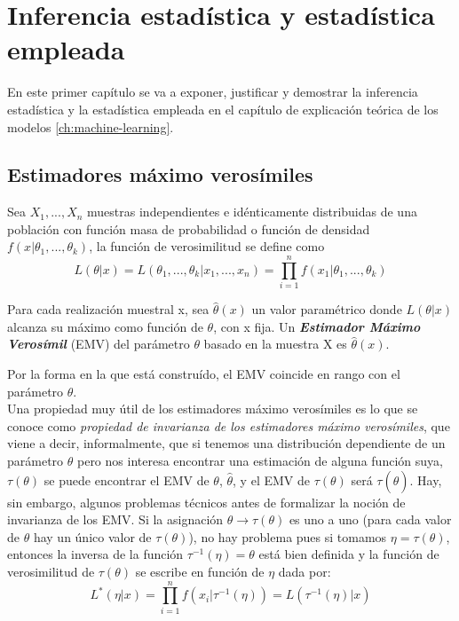
\chapter{Inferencia estadística y estadística empleada}
En este primer capítulo se va a exponer, justificar y demostrar la inferencia estadística y la estadística empleada en el capítulo de explicación teórica de los modelos \autoref{ch:machine-learning}.\\
\section{Estimadores máximo verosímiles}\label{st:emv}
Sea $X_{1},...,X_{n}$ muestras independientes e idénticamente distribuidas de una población con función masa de probabilidad o función de densidad $f(x \vert \theta_{1},...,\theta_{k})$, la función de verosimilitud se define como
\[ L(\theta \vert x)=L(\theta_{1},...,\theta_{k} \vert x_{1},...,x_{n})=\prod_{i=1}^{n} f(x_{1} \vert \theta_{1},...,\theta_{k}) \]
\begin{definicion}
Para cada realización muestral x, sea $\hat{\theta}(x)$ un valor paramétrico donde $L(\theta \vert x)$ alcanza su máximo como función de $\theta$, con x fija. Un \textbf{\textit{Estimador Máximo Verosímil}} (EMV) del parámetro $\theta$ basado en la muestra X es $\hat{\theta}(x)$. \cite{garthwaite2002statistical} \end{definicion}
Por la forma en la que está construído, el EMV coincide en rango con el parámetro $\theta$.\\
Una propiedad muy útil de los estimadores máximo verosímiles es lo que se conoce como \textit{propiedad de invarianza de los estimadores máximo verosímiles}, que viene a decir, informalmente, que si tenemos una distribución dependiente de un parámetro $\theta$ pero nos interesa encontrar una estimación de alguna función suya, $\tau(\theta)$ se puede encontrar el EMV de $\theta$, $\hat{\theta}$, y el EMV de $\tau(\theta)$ será $\tau(\hat{\theta})$. Hay, sin embargo, algunos problemas técnicos antes de formalizar la noción de invarianza de los EMV. Si la asignación $\theta \rightarrow \tau(\theta)$ es uno a uno (para cada valor de $\theta$ hay un único valor de $\tau(\theta)$), no hay problema pues si tomamos $\eta = \tau(\theta)$, entonces la inversa de la función $\tau^{-1}(\eta)=\theta$ está bien definida y la función de verosimilitud de $\tau(\theta)$ se escribe en función de $\eta$ dada por: \[ L^{*}(\eta \vert x) = \prod_{i=1}^{n}f(x_{i} \vert \tau^{-1}(\eta)) = L(\tau^{-1}(\eta) \vert x) \]
